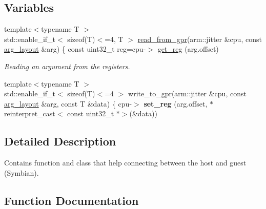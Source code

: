 \subsection*{Variables}
\begin{DoxyCompactItemize}
\item 
{\footnotesize template$<$typename T $>$ }\\std\+::enable\+\_\+if\+\_\+t$<$ sizeof(T)$<$=4, T $>$ \mbox{\hyperlink{namespaceeka2l1_1_1hle_a968725b7666c3d213e81ac7265711168}{read\+\_\+from\+\_\+gpr}}(arm\+::jitter \&cpu, const \mbox{\hyperlink{structeka2l1_1_1hle_1_1arg__layout}{arg\+\_\+layout}} \&arg) \{ const uint32\+\_\+t reg=cpu-\/$>$ \mbox{\hyperlink{namespaceeka2l1_1_1hle_ae2b6a20800f71c68b2eb69e136b73b39}{get\+\_\+reg}} (arg.\+offset)
\begin{DoxyCompactList}\small\item\em Reading an argument from the registers. \end{DoxyCompactList}\item 
\mbox{\label{namespaceeka2l1_1_1hle_af2807f14c730afa46c189647e1359daa}} 
{\footnotesize template$<$typename T $>$ }\\std\+::enable\+\_\+if\+\_\+t$<$ sizeof(T)$<$=4 $>$ write\+\_\+to\+\_\+gpr(arm\+::jitter \&cpu, const \mbox{\hyperlink{structeka2l1_1_1hle_1_1arg__layout}{arg\+\_\+layout}} \&arg, const T \&data) \{ cpu-\/$>$ {\bfseries set\+\_\+reg} (arg.\+offset, $\ast$reinterpret\+\_\+cast$<$ const uint32\+\_\+t $\ast$$>$(\&data))
\end{DoxyCompactItemize}


\subsection{Detailed Description}
Contains function and class that help connecting between the host and guest (Symbian). 

\subsection{Function Documentation}
\mbox{\label{namespaceeka2l1_1_1hle_af2d821b701c6bea2502bce0082bf559f}} 
